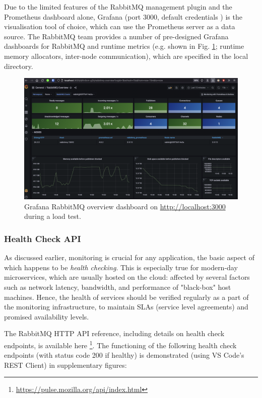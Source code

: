 Due to the limited features of the RabbitMQ management plugin and the Prometheus dashboard alone, Grafana (port 3000, default credentials ) is the visualisation tool of choice, which can use the Prometheus server as a data source. The RabbitMQ team provides a number of pre-designed Grafana dashboards for RabbitMQ and runtime metrics (e.g.  shown in Fig. \ref{fig:grafana-overview}; runtime memory allocators, inter-node communication), which are specified in the local  directory.

\begin{figure}[H]
  \centering
  \includegraphics[width=1.0\linewidth]{./assets/images/case-studies/grafana-overview.png}
  \caption{Grafana RabbitMQ overview dashboard on \url{http://localhost:3000} during a load test.}
  \label{fig:grafana-overview}
\end{figure}


\subsubsection{Health Check API}

As discussed earlier, monitoring is crucial for any application, the basic aspect of which happens to be \textit{health checking}. This is especially true for modern-day microservices, which are usually hosted on the cloud: affected by several factors such as network latency, bandwidth, and performance of "black-box" host machines. Hence, the health of services should be verified regularly as a part of the monitoring infrastructure, to maintain SLAs (service level agreements) and promised availability levels.

The RabbitMQ HTTP API reference, including details on health check endpoints, is available here \footnote{\url{https://pulse.mozilla.org/api/index.html}}. The functioning of the following health check endpoints (with status code 200 if healthy) is demonstrated (using VS Code's REST Client) in supplementary figures:

